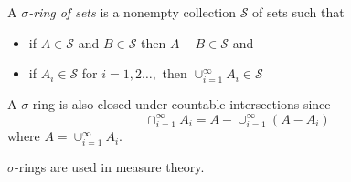 \documentclass[12pt]{article}
\begin{document}
A \emph{$\sigma$-ring of sets} is a nonempty collection $\mathcal{S}$ of sets such that
\begin{itemize}
\item
if $A \in \mathcal{S}$ and $B \in \mathcal{S}$ then $A-B \in \mathcal{S}$ and
\item
if $A_i \in \mathcal{S}$ for $i=1,2 \ldots,$ then $\cup_{i=1}^{\infty} A_i \in \mathcal{S}$
\end{itemize}

A $\sigma$-ring is also closed under countable intersections since
$$
\cap_{i=1}^{\infty} A_i = A - \cup_{i=1}^{\infty}(A-A_i)
$$
where $A = \cup_{i=1}^{\infty} A_i$.

$\sigma$-rings are  used in measure theory.

\end{document}
